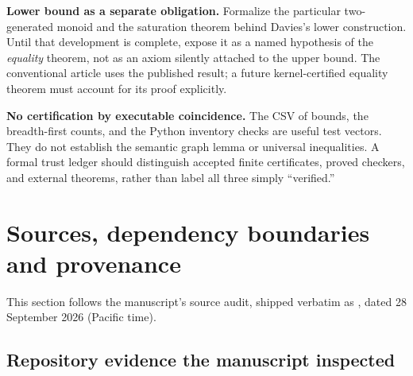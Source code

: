 \documentclass[11pt,a4paper]{article}
\numberwithin{equation}{section}
\theoremstyle{definition}
\theoremstyle{remark}
\begin{document}
\par\medskip\noindent\textbf{Lower bound as a separate obligation.} Formalize
the particular two-generated monoid and the saturation theorem behind
Davies's lower construction. Until that development is complete, expose it as
a named hypothesis of the \emph{equality} theorem, not as an axiom silently
attached to the upper bound. The conventional article uses the published
result; a future kernel-certified equality theorem must account for its proof
explicitly.

\par\medskip\noindent\textbf{No certification by executable coincidence.}
The CSV of bounds, the breadth-first counts, and the Python inventory checks
are useful test vectors. They do not establish the semantic graph lemma or
universal inequalities. A formal trust ledger should distinguish accepted
finite certificates, proved checkers, and external theorems, rather than
label all three simply ``verified.''

\section{Sources, dependency boundaries and provenance}\label{tor:sec:audit}

This section follows the manuscript's source audit, shipped verbatim as
, dated 28 September 2026 (Pacific
time).

\subsection{Repository evidence the manuscript inspected}
\end{document}
